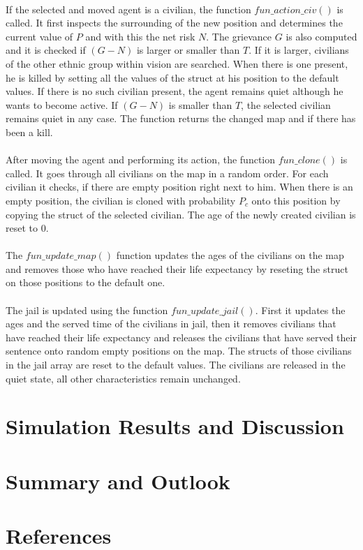 \documentclass[11pt]{article}
\begin{document}
\\
If the selected and moved agent is a civilian, the function $fun\_action\_civ()$ is called. It first inspects the surrounding of the new position and determines the current value of $P$ and with this the net risk $N$. The grievance $G$ is also computed and it is checked if $(G-N)$ is larger or smaller than $T$. If it is larger, civilians of the other ethnic group within vision are searched. When there is one present, he is killed by setting all the values of the struct at his position to the default values. If there is no such civilian present, the agent remains quiet although he wants to become active. If $(G-N)$ is smaller than $T$, the selected civilian remains quiet in any case. The function returns the changed map and if there has been a kill.\\
\\
After moving the agent and performing its action, the function $fun\_clone()$ is called. It goes through all civilians on the map in a random order. For each civilian it checks, if there are empty position right next to him. When there is an empty position, the civilian is cloned with probability $P_c$ onto this position by copying the struct of the selected civilian. The age of the newly created civilian is reset to 0.\\
\\
The $fun\_update\_map()$ function updates the ages of the civilians on the map and removes those who have reached their life expectancy by reseting the struct on those positions to the default one.\\
\\
The jail is updated using the function $fun\_update\_jail()$. First it updates the ages and the served time of the civilians in jail, then it removes civilians that have reached their life expectancy and releases the civilians that have served their sentence onto random empty positions on the map. The structs of those civilians in the jail array are reset to the default values. The civilians are released in the quiet state, all other characteristics remain unchanged.

\section{Simulation Results and Discussion}

\section{Summary and Outlook}

\section{References}
\end{document}
